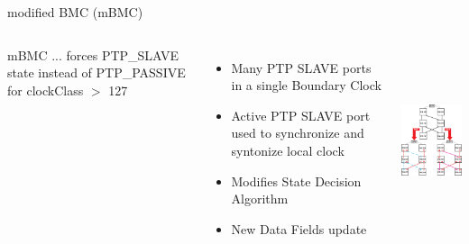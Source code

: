 \documentclass[compress,red]{beamer}
\begin{document}
\begin{frame}{modified BMC (mBMC)}

\begin{columns}[c]

    \begin{block}{mBMC}
    ... forces PTP\_SLAVE state instead of PTP\_PASSIVE for clockClass $>$ 127
    \end{block}

    \begin{itemize}
	\item Many PTP SLAVE ports in a single Boundary Clock
	\item Active PTP SLAVE port used to synchronize and syntonize local clock
	\item Modifies State Decision Algorithm
	\item New Data Fields update
      \end{itemize}

    \begin{center}
    \includegraphics[height=5.5cm]{protocol/mBMCvsBMC.pdf}
    \end{center}

\end{columns}

\end{frame}
\end{document}
